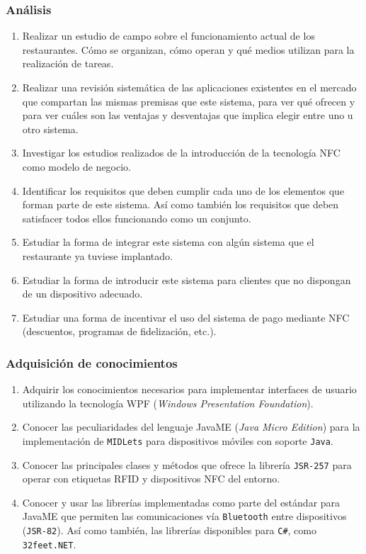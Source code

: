 \subsubsection{Análisis}
\begin{enumerate}
\item Realizar un estudio de campo sobre el funcionamiento actual de los
  restaurantes. Cómo se organizan, cómo operan y qué medios utilizan para la
  realización de tareas.
\item Realizar una revisión sistemática de las aplicaciones existentes en el
  mercado que compartan las mismas premisas que este sistema, para ver qué
  ofrecen y para ver cuáles son las ventajas y desventajas que implica elegir
  entre uno u otro sistema.
\item Investigar los estudios realizados de la introducción de la tecnología
  \acs{NFC} como modelo de negocio.
\item Identificar los requisitos que deben cumplir cada uno de los elementos
  que forman parte de este sistema. Así como también los requisitos que
  deben satisfacer todos ellos funcionando como un conjunto.
\item Estudiar la forma de integrar este sistema con algún sistema que el
  restaurante ya tuviese implantado.
\item Estudiar la forma de introducir este sistema para clientes que no
  dispongan de un dispositivo adecuado.
\item Estudiar una forma de incentivar el uso del sistema de pago mediante
  \acs{NFC} (descuentos, programas de fidelización, etc.).
\end{enumerate}

\subsubsection{Adquisición de conocimientos}
\begin{enumerate}
\item Adquirir los conocimientos necesarios para implementar interfaces de
  usuario utilizando la tecnología \acs{WPF} (\emph{Windows Presentation
  Foundation}).
\item Conocer las peculiaridades del lenguaje \acs{JavaME} (\emph{Java Micro
  Edition}) para la implementación de \texttt{MIDLets} para dispositivos móviles
  con soporte \texttt{Java}.
\item Conocer las principales clases y métodos que ofrece la librería
  \texttt{\acs{JSR}-257} para operar con etiquetas \acs{RFID} y dispositivos
  \acs{NFC} del entorno.
\item Conocer y usar las librerías implementadas como parte del estándar para
  \acs{JavaME} que permiten las comunicaciones vía \texttt{Bluetooth} entre 
  dispositivos (\texttt{\acs{JSR}-82}). Así como también, las librerías
  disponibles para \texttt{C\#}, como \texttt{32feet.NET}.
\end{enumerate}

